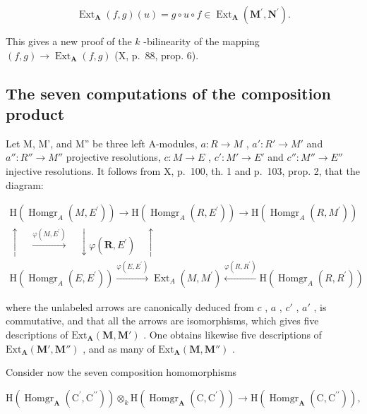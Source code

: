 \[
\operatorname{Ext} _ {\mathbf {A}} (f, g) (u) = g \circ u \circ f \in \operatorname{Ext} _ {\mathbf {A}} (\mathbf {M} ^ {\prime}, \mathbf {N} ^ {\prime}).\tag{3}
\]

This gives a new proof of the \(k\) -bilinearity of the mapping \((f, g) \to \operatorname{Ext}_{\mathbf{A}}(f, g)\) (X, p.~88, prop. 6).

\subsection{The seven computations of the composition product}

Let M, M', and M'' be three left A-modules, \(a : R \to M\) , \(a' : R' \to M'\) and \(a'' : R'' \to M''\) projective resolutions, \(c : M \to E\) , \(c' : M' \to E'\) and \(c'' : M'' \to E''\) injective resolutions. It follows from X, p.~100, th. 1 and p.~103, prop. 2, that the diagram:

\[
\begin{array}{c} \mathrm{H} (\operatorname{Homgr} _ {A} (M, E ^ {\prime})) \xrightarrow {} \mathrm{H} (\operatorname{Homgr} _ {A} (R, E ^ {\prime})) \xrightarrow {} \mathrm{H} (\operatorname{Homgr} _ {A} (R, M ^ {\prime})) \\ \uparrow \quad \xrightarrow {\varphi (M , E ^ {\prime})} \quad \downarrow \varphi (\mathbf {R}, E ^ {\prime}) \quad \uparrow \\ \mathrm{H} (\operatorname{Homgr} _ {A} (E, E ^ {\prime})) \xrightarrow {\varphi (E , E ^ {\prime})} \operatorname{Ext} _ {A} (M, M ^ {\prime}) \xleftarrow {\varphi (R , R ^ {\prime})} \mathrm{H} (\operatorname{Homgr} _ {A} (R, R ^ {\prime})) \end{array}
\]

where the unlabeled arrows are canonically deduced from \(c\) , \(a\) , \(c'\) , \(a'\) , is commutative, and that all the arrows are isomorphisms, which gives five descriptions of \(\mathrm{Ext}_{\mathbf{A}}(\mathbf{M}, \mathbf{M}')\) . One obtains likewise five descriptions of \(\mathrm{Ext}_{\mathbf{A}}(\mathbf{M}', \mathbf{M}'')\) , and as many of \(\mathrm{Ext}_{\mathbf{A}}(\mathbf{M}, \mathbf{M}'')\) .

Consider now the seven composition homomorphisms

\[
\mathrm{H} \left(\operatorname{Homgr} _ {\mathbf {A}} \left(\mathrm{C} ^ {\prime}, \mathrm{C} ^ {\prime \prime}\right)\right) \otimes_ {k} \mathrm{H} \left(\operatorname{Homgr} _ {\mathbf {A}} \left(\mathrm{C}, \mathrm{C} ^ {\prime}\right)\right)\rightarrow \mathrm{H} \left(\operatorname{Homgr} _ {\mathbf {A}} \left(\mathrm{C}, \mathrm{C} ^ {\prime \prime}\right)\right),
\]

